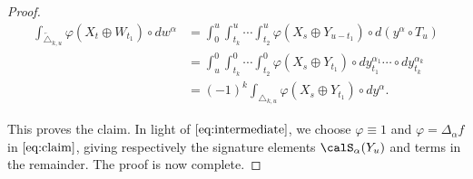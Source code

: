 \begin{proof}
\begin{align*}
        \int_{\overleftarrow{\triangle}_{k,u} } \varphi(X_t \oplus W_{t_1})  \circ  dw^{\alpha} &=
          \int_{0}^u  \int_{t_k}^u \cdots \int_{t_2}^u   \varphi(X_s \oplus Y_{u-t_1}) \circ d \left(y^{\alpha} \circ T_u\right) \\ %
        &= \int_{u}^0  \int_{t_k}^{0} \cdots \int_{t_2}^0   \varphi(X_s \oplus Y_{t_1})  \circ  dy_{t_1}^{\alpha_1} \cdots \circ  dy_{t_k}^{\alpha_k}\\
          &=
        (-1)^{k}  \int_{\triangle_{k,u} } \varphi(X_s \oplus Y_{t_1})  \circ  dy^{\alpha}. 
\end{align*}

This proves the claim. In light of $\eqref{eq:intermediate}$, we choose  $\varphi \equiv 1$ and $\varphi=\Delta_{\alpha}f$ in $\eqref{eq:claim}$,  giving respectively the signature elements $\calS_{\alpha}(Y_u)$ and  terms in the remainder. The proof is now complete.  
    
\end{proof}


